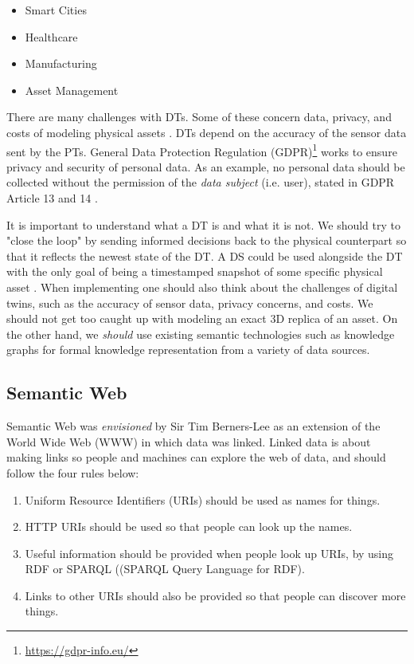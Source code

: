 \documentclass{article}
\begin{document}
\begin{itemize}
    \item Smart Cities
    \item Healthcare
    \item Manufacturing
    \item Asset Management
\end{itemize}


There are many challenges with DTs. Some of these concern data, privacy, and costs of modeling physical assets \cite{fuller_digital_2020, waszak_let_2022}. DTs depend on the accuracy of the sensor data sent by the PTs. General Data Protection Regulation (GDPR)\footnote{\url{https://gdpr-info.eu/}} works to ensure privacy and security of personal data. As an example, no personal data should be collected without the permission of the \emph{data subject} (i.e. user), stated in GDPR Article 13 and 14 \cite{noauthor_guide_nodate}.


It is important to understand what a DT is and what it is not. We should try to "close the loop" by sending informed decisions back to the physical counterpart so that it reflects the newest state of the DT. A DS could be used alongside the DT with the only goal of being a timestamped snapshot of some specific physical asset \cite{bergs_concept_2021}. When implementing one should also think about the challenges of digital twins, such as the accuracy of sensor data, privacy concerns, and costs. We should not get too caught up with modeling an exact 3D replica of an asset. On the other hand, we \emph{should} use existing semantic technologies such as knowledge graphs for formal knowledge representation from a variety of data sources.





\subsection{Semantic Web}
Semantic Web was \emph{envisioned} by Sir Tim Berners-Lee as an extension of the World Wide Web (WWW) in which data was linked. Linked data is about making links so people and machines can explore the web of data, and should follow the four rules \cite{tim_berners-lee_linked_nodate} below: 

\begin{enumerate}
    \item Uniform Resource Identifiers (URIs) should be used as names for things.
    \item HTTP URIs should be used so that people can look up the names.
    \item Useful information should be provided when people look up URIs, by using RDF or SPARQL ((SPARQL Query Language for RDF).
    \item Links to other URIs should also be provided so that people can discover more things.
\end{enumerate}
\end{document}
